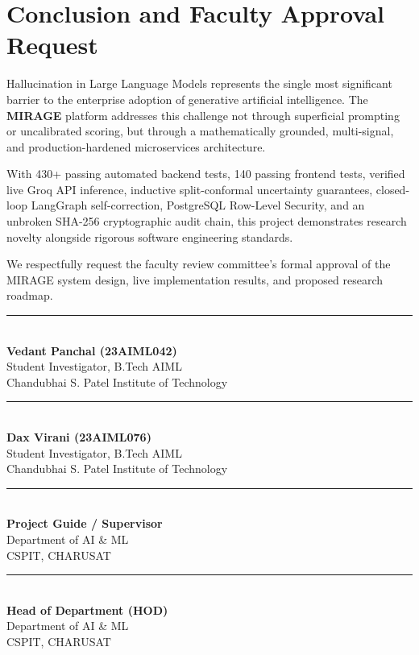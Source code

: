 \documentclass[11pt,a4paper]{article}
\begin{document}
\section{Conclusion and Faculty Approval Request}

Hallucination in Large Language Models represents the single most significant barrier to the enterprise adoption of generative artificial intelligence. The \textbf{MIRAGE} platform addresses this challenge not through superficial prompting or uncalibrated scoring, but through a mathematically grounded, multi-signal, and production-hardened microservices architecture.

With 430+ passing automated backend tests, 140 passing frontend tests, verified live Groq API inference, inductive split-conformal uncertainty guarantees, closed-loop LangGraph self-correction, PostgreSQL Row-Level Security, and an unbroken SHA-256 cryptographic audit chain, this project demonstrates research novelty alongside rigorous software engineering standards.

\vspace{0.6cm}

\noindent We respectfully request the faculty review committee's formal approval of the MIRAGE system design, live implementation results, and proposed research roadmap.

\vspace{1.2cm}

\begin{minipage}[t]{0.45\textwidth}
    \rule{\linewidth}{0.6pt}\\
    \textbf{Vedant Panchal (23AIML042)}\\
    Student Investigator, B.Tech AIML\\
    Chandubhai S. Patel Institute of Technology
\end{minipage}
\hfill
\begin{minipage}[t]{0.45\textwidth}
    \rule{\linewidth}{0.6pt}\\
    \textbf{Dax Virani (23AIML076)}\\
    Student Investigator, B.Tech AIML\\
    Chandubhai S. Patel Institute of Technology
\end{minipage}

\vspace{1.2cm}

\begin{minipage}[t]{0.45\textwidth}
    \rule{\linewidth}{0.6pt}\\
    \textbf{Project Guide / Supervisor}\\
    Department of AI \& ML\\
    CSPIT, CHARUSAT
\end{minipage}
\hfill
\begin{minipage}[t]{0.45\textwidth}
    \rule{\linewidth}{0.6pt}\\
    \textbf{Head of Department (HOD)}\\
    Department of AI \& ML\\
    CSPIT, CHARUSAT
\end{minipage}
\end{document}
